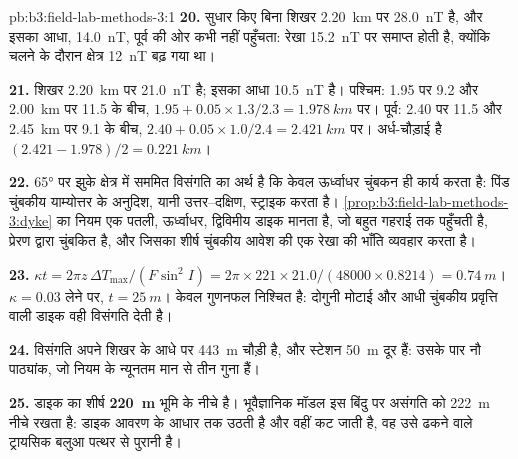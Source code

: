 \begin{solution}{pb:b3:field-lab-methods-3:1}
\textbf{20.} सुधार किए बिना शिखर \qty{2.20}{km} पर \qty{28.0}{nT} है, और
इसका आधा, \qty{14.0}{nT}, पूर्व की ओर कभी नहीं पहुँचता: रेखा
\qty{15.2}{nT} पर समाप्त होती है, क्योंकि चलने के दौरान क्षेत्र
\qty{12}{nT} बढ़ गया था।

\textbf{21.} शिखर \qty{2.20}{km} पर \qty{21.0}{nT} है; इसका आधा
\qty{10.5}{nT} है। पश्चिम: \num{1.95} पर \num{9.2} और \qty{2.00}{km} पर \num{11.5} के बीच,
$1.95 + 0.05\times1.3/2.3 = \qty{1.978}{km}$ पर। पूर्व:
\num{2.40} पर \num{11.5} और \qty{2.45}{km} पर \num{9.1} के बीच,
$2.40 + 0.05\times1.0/2.4 = \qty{2.421}{km}$ पर। अर्ध-चौड़ाई है $(2.421
- 1.978)/2 = \qty{0.221}{km}$।

\textbf{22.} \ang{65} पर झुके क्षेत्र में सममित विसंगति का अर्थ है कि केवल
ऊर्ध्वाधर चुंबकन ही कार्य करता है: पिंड चुंबकीय याम्योत्तर के
अनुदिश, यानी उत्तर--दक्षिण, स्ट्राइक करता है।
\cref{prop:b3:field-lab-methods-3:dyke} का नियम एक पतली, ऊर्ध्वाधर,
द्विविमीय डाइक मानता है, जो बहुत गहराई तक पहुँचती है, प्रेरण द्वारा चुंबकित है,
और जिसका शीर्ष चुंबकीय आवेश की एक रेखा की भाँति व्यवहार करता है।

\textbf{23.} $\kappa t = 2\pi z\,\Delta T_\mathrm{max}/(F\sin^2 I) = 2\pi\times
221\times21.0/(48000\times0.8214) = \qty{0.74}{m}$। $\kappa =
0.03$ लेने पर, $t = \qty{25}{m}$। केवल गुणनफल निश्चित है: दोगुनी
मोटाई और आधी चुंबकीय प्रवृत्ति वाली डाइक वही विसंगति देती है।

\textbf{24.} विसंगति अपने शिखर के आधे पर \qty{443}{m} चौड़ी है, और स्टेशन
\qty{50}{m} दूर हैं: उसके पार नौ पाठ्यांक, जो नियम के
न्यूनतम मान से तीन गुना हैं।

\textbf{25.} डाइक का शीर्ष
\textbf{\qty[text-series-to-math=true]{220}{m}} भूमि के नीचे है। भूवैज्ञानिक
मॉडल इस बिंदु पर असंगति को \qty{222}{m} नीचे रखता है:
डाइक आवरण के आधार तक उठती है और वहीं कट जाती है, वह
उसे ढकने वाले ट्रायसिक बलुआ पत्थर से पुरानी है।
\end{solution}
